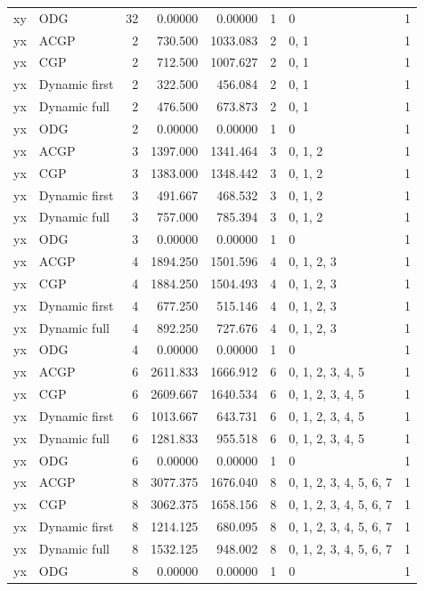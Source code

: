 \documentclass[10pt,a4paper]{article}
\begin{document}
\begin{longtable}{@{}p{23mm}p{29mm}rrrrp{36mm}r@{}}
xy & ODG & 32 & 0.00000 & 0.00000 & 1 & 0 & 1 \\
yx & ACGP & 2 & 730.500 & 1033.083 & 2 & 0, 1 & 1 \\
yx & CGP & 2 & 712.500 & 1007.627 & 2 & 0, 1 & 1 \\
yx & Dynamic first & 2 & 322.500 & 456.084 & 2 & 0, 1 & 1 \\
yx & Dynamic full & 2 & 476.500 & 673.873 & 2 & 0, 1 & 1 \\
yx & ODG & 2 & 0.00000 & 0.00000 & 1 & 0 & 1 \\
yx & ACGP & 3 & 1397.000 & 1341.464 & 3 & 0, 1, 2 & 1 \\
yx & CGP & 3 & 1383.000 & 1348.442 & 3 & 0, 1, 2 & 1 \\
yx & Dynamic first & 3 & 491.667 & 468.532 & 3 & 0, 1, 2 & 1 \\
yx & Dynamic full & 3 & 757.000 & 785.394 & 3 & 0, 1, 2 & 1 \\
yx & ODG & 3 & 0.00000 & 0.00000 & 1 & 0 & 1 \\
yx & ACGP & 4 & 1894.250 & 1501.596 & 4 & 0, 1, 2, 3 & 1 \\
yx & CGP & 4 & 1884.250 & 1504.493 & 4 & 0, 1, 2, 3 & 1 \\
yx & Dynamic first & 4 & 677.250 & 515.146 & 4 & 0, 1, 2, 3 & 1 \\
yx & Dynamic full & 4 & 892.250 & 727.676 & 4 & 0, 1, 2, 3 & 1 \\
yx & ODG & 4 & 0.00000 & 0.00000 & 1 & 0 & 1 \\
yx & ACGP & 6 & 2611.833 & 1666.912 & 6 & 0, 1, 2, 3, 4, 5 & 1 \\
yx & CGP & 6 & 2609.667 & 1640.534 & 6 & 0, 1, 2, 3, 4, 5 & 1 \\
yx & Dynamic first & 6 & 1013.667 & 643.731 & 6 & 0, 1, 2, 3, 4, 5 & 1 \\
yx & Dynamic full & 6 & 1281.833 & 955.518 & 6 & 0, 1, 2, 3, 4, 5 & 1 \\
yx & ODG & 6 & 0.00000 & 0.00000 & 1 & 0 & 1 \\
yx & ACGP & 8 & 3077.375 & 1676.040 & 8 & 0, 1, 2, 3, 4, 5, 6, 7 & 1 \\
yx & CGP & 8 & 3062.375 & 1658.156 & 8 & 0, 1, 2, 3, 4, 5, 6, 7 & 1 \\
yx & Dynamic first & 8 & 1214.125 & 680.095 & 8 & 0, 1, 2, 3, 4, 5, 6, 7 & 1 \\
yx & Dynamic full & 8 & 1532.125 & 948.002 & 8 & 0, 1, 2, 3, 4, 5, 6, 7 & 1 \\
yx & ODG & 8 & 0.00000 & 0.00000 & 1 & 0 & 1 \\

\end{longtable}
\end{document}
